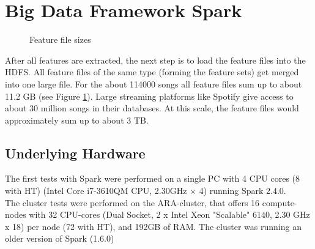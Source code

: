 
\section{Big Data Framework Spark}\label{bds1}

\begin{figure}[htbp]
	\centering
	\caption{Feature file sizes}
	\label{filesize}
\end{figure}

After all features are extracted, the next step is to load the feature files into the HDFS.
All feature files of the same type (forming the feature sets) get merged into one large file. For the about 114000 songs all feature files sum up to about 11.2 GB (see Figure \ref{filesize}). 
\noindent Large streaming platforms like Spotify give access to about 30 million songs in their databases. At this scale, the feature files would approximately sum up to about 3 TB.\\

\subsection{Underlying Hardware}

The first tests with Spark were performed on a single PC with 4 CPU cores (8 with HT) (Intel Core i7-3610QM CPU, 2.30GHz × 4) running Spark 2.4.0.\\ The cluster tests were performed on the ARA-cluster, that offers 16 compute-nodes with 32 CPU-cores (Dual Socket, 2 x Intel Xeon "Scalable" 6140, 2.30 GHz x 18) per node (72 with HT), and 192GB of RAM. The cluster was running an older version of Spark (1.6.0)\\

